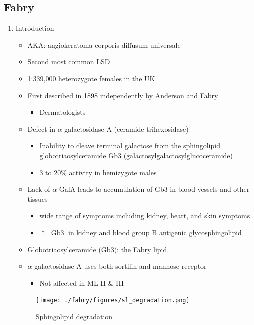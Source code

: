 \documentclass{scrartcl}
\begin{document}
\subsection{Fabry}
\label{sec:orge433d5f}
\begin{enumerate}
\item Introduction
\label{sec:orga6c0bd8}
\begin{itemize}
\item AKA: angiokeratoma corporis diffusum universale
\item Second most common LSD
\item 1:339,000 heterozygote females in the UK
\item First described in 1898 independently by Anderson and Fabry
\begin{itemize}
\item Dermatologists
\end{itemize}
\item Defect in \(\alpha\)-galactosidase A (ceramide trihexosidase)
\begin{itemize}
\item Inability to cleave terminal galactose from the sphingolipid globotriaosylceramide Gb3 (galactosylgalactosylglucoceramide)
\item 3 to 20\% activity in hemizygote males
\end{itemize}
\item Lack of \(\alpha\)-GalA leads to accumulation of Gb3 in blood vessels and other tissues
\begin{itemize}
\item wide range of symptoms including kidney, heart, and skin symptoms
\item \(\uparrow\) [Gb3] in kidney and blood group B antigenic glycosphingolipid
\end{itemize}
\item Globotriaosylceramide (Gb3): the Fabry lipid
\item \(\alpha\)-galactosidase A uses both sortilin and mannose receptor
\begin{itemize}
\item Not affected in ML II \& III
\end{itemize}
\end{itemize}

\begin{figure}[htbp]
\centering
\texttt{[image: ./fabry/figures/sl\_degradation.png]}
\caption[Sphingolipid degradation]{\label{fig:org87b3cf3}
Sphingolipid degradation}
\end{figure}



\end{enumerate}
\end{document}
